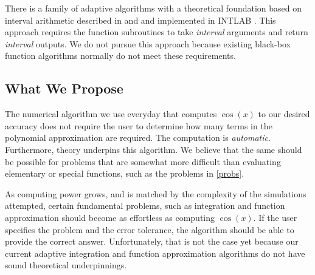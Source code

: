 \documentclass[11pt]{NSFamsart}
\begin{document}
There is a family of adaptive algorithms with a theoretical foundation based on interval 
arithmetic 
described in \cite{MoKeCl09} and \cite{Rum10a} and implemented in INTLAB \cite{Rum99a}.  
This 
approach requires the function subroutines to take \emph{interval} arguments and return 
\emph{interval} 
outputs.  
We do not pursue this approach because existing black-box function algorithms
normally 
do not meet these requirements.

\subsection{What We Propose}
The numerical algorithm we use everyday that computes $\cos(x)$ to our desired accuracy does 
not require the user to determine how many terms in the polynomial 
approximation are required.  The computation is \emph{automatic}.  Furthermore, theory 
underpins this algorithm.  We believe that the same should be possible for problems that are 
somewhat more difficult than evaluating elementary or special functions, such as the problems in 
\eqref{probs}.  

As computing power grows, and is matched by the complexity of the simulations attempted, certain 
fundamental problems, such as integration and function approximation should become 
as effortless as computing $\cos(x)$.  If the user specifies the problem and the error tolerance, the 
algorithm should be able to provide the correct answer.  Unfortunately, 
that is not the case yet because our current adaptive integration and function approximation 
algorithms do not have sound theoretical underpinnings.
\end{document}
